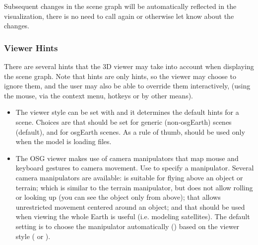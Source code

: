 Subsequent changes in the scene graph will be automatically reflected in
the visualization, there is no need to call  again or
otherwise let {\opp} know about the changes.


\subsubsection{Viewer Hints}

There are several hints that the 3D viewer may take into account when displaying
the scene graph. Note that hints are only hints, so the viewer may choose to
ignore them, and the user may also be able to override them interactively,
(using the mouse, via the context menu, hotkeys or by other means).

\begin{itemize}

\item {}
    The viewer style can be set with  and it determines
    the default hints for a scene. Choices are  that should
    be set for generic (non-osgEarth) scenes (default), and 
    for osgEarth scenes. As a rule of thumb,  should be used
    only when the model is loading  files.

\item {}
    The OSG viewer makes use of camera manipulators that map mouse and keyboard
    gestures to camera movement. Use  to
    specify a manipulator. Several camera manipulators are available:
     is suitable for flying above an object or terrain;
     which is similar to the terrain manipulator, but does
    not allow rolling or looking up (you can see the object only from above);
     that allows unrestricted movement centered around an
    object; and  that should be used when viewing the whole
    Earth is useful (i.e. modeling satellites). The default setting is to
    choose the manipulator automatically () based on the viewer
    style ( or ).


\end{itemize}
